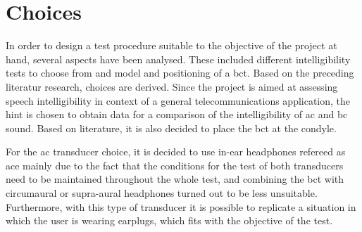 \section{Choices}
In order to design a test procedure suitable to the objective of the project at hand, several aspects have been analysed. These included different intelligibility tests to choose from and model and positioning of a \gls{bct}.
Based on the preceding literatur research, choices are derived.
Since the project is aimed at assessing speech intelligibility in context of a general telecommunications application, the \gls{hint} is chosen to obtain data for a  comparison of the intelligibility of \gls{ac} and \gls{bc} sound.
Based on literature, it is also decided to place the \gls{bct} at the condyle.


For the \gls{ac} transducer choice, it is decided to use in-ear headphones refereed as \gls{ace} mainly due to the fact that the conditions for the test of both transducers need to be maintained throughout the whole test, and combining the \gls{bct} with circumaural or supra-aural headphones turned out to be less unsuitable. Furthermore, with this type of transducer it is possible to replicate a situation in which the user is wearing earplugs, which fits with the objective of the test.